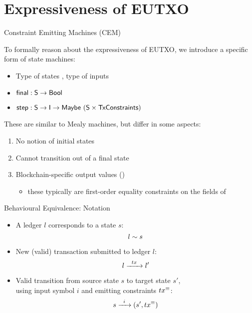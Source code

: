 \section{Expressiveness of EUTXO}

\begin{frame}{Constraint Emitting Machines (CEM)}

To formally reason about the expressiveness of EUTXO, we introduce a specific form of state machines:
\begin{itemize}
\item Type of states , type of inputs 
\item $\textsf{final} : \textsf{S} \rightarrow \textsf{Bool}$
\item $\textsf{step} : \textsf{S} \rightarrow \textsf{I} \rightarrow \textsf{Maybe}\ (\textsf{S} \times \textsf{TxConstraints})$
\end{itemize}

These are similar to Mealy machines, but differ in some aspects:
\begin{enumerate}
\item No notion of initial states
\item Cannot transition out of a final state
\item Blockchain-specific output values ()
  \begin{itemize}
  \item these typically are first-order equality constraints on the fields of 
  \end{itemize}
\end{enumerate}

\end{frame}

\begin{frame}{Behavioural Equivalence: Notation}

\begin{itemize}
\item A ledger $l$ corresponds to a \CEM{} state $s$:
\[
 l \sim s 
\]
\item New (valid) transaction submitted to ledger $l$:
\[
 l \xrightarrow{\hspace{5pt} tx \hspace{5pt}} l' 
\]
\item Valid \CEM{} transition from source state $s$ to target state $s'$,\\
using input symbol $i$ and emitting constraints $tx^\equiv$:
\[
 s \xrightarrow{\hspace{5pt} i \hspace{5pt}} (s' , tx^\equiv) 
\]
\end{itemize}

\end{frame}

